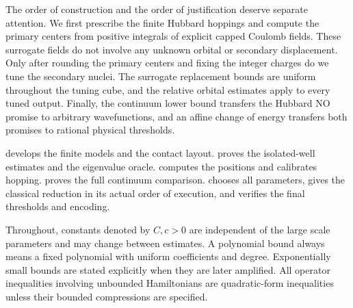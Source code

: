 The order of construction and the order of justification deserve separate attention. We first prescribe the finite Hubbard hoppings and compute the primary centers from positive integrals of explicit capped Coulomb fields. These surrogate fields do not involve any unknown orbital or secondary displacement. Only after rounding the primary centers and fixing the integer charges do we tune the secondary nuclei. The surrogate replacement bounds are uniform throughout the tuning cube, and the relative orbital estimates apply to every tuned output. Finally, the continuum lower bound transfers the Hubbard NO promise to arbitrary wavefunctions, and an affine change of energy transfers both promises to rational physical thresholds.

 develops the finite models and the contact layout.  proves the isolated-well estimates and the eigenvalue oracle.  computes the positions and calibrates hopping.  proves the full continuum comparison.  chooses all parameters, gives the classical reduction in its actual order of execution, and verifies the final thresholds and encoding.

Throughout, constants denoted by $C,c>0$ are independent of the large scale parameters and may change between estimates. A polynomial bound always means a fixed polynomial with uniform coefficients and degree. Exponentially small bounds are stated explicitly when they are later amplified. All operator inequalities involving unbounded Hamiltonians are quadratic-form inequalities unless their bounded compressions are specified.

